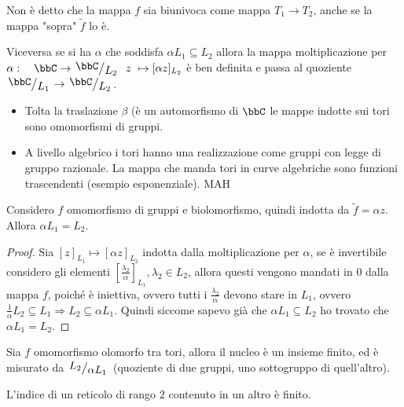 
\begin{osservazione}
Non è detto che la mappa $f$ sia biunivoca come mappa $T_1\rightarrow T_2$, anche se la mappa "sopra" $\tilde{f}$ lo è.
\end{osservazione}

Viceversa se si ha $\alpha$ che soddisfa $\alpha L_1 \subseteq L_2$  allora la mappa moltiplicazione per $\alpha: \quad \bbC \rightarrow \quotient{\bbC}{L_2} \hquad z\ \mapsto [\alpha z]_{L_2} $ è ben definita e passa al quoziente $\quotient{\bbC}{L_1}\rightarrow \quotient{\bbC}{L_2}$.

\begin{osservazione}
\begin{itemize}
\item Tolta la traslazione $\beta$ (è un automorfismo di $\bbC$ le mappe indotte sui tori sono omomorfismi di gruppi.
\item A livello algebrico i tori hanno una realizzazione come gruppi con legge di gruppo razionale.
La mappa che manda tori in curve algebriche sono funzioni trascendenti (esempio esponenziale). MAH
\end{itemize}
\end{osservazione}


\begin{fatto} Considero $f$ omomorfismo di gruppi e biolomorfismo, quindi indotta da $\tilde{f}=\alpha z$. Allora $\alpha L_1=L_2$.
\end{fatto}
\begin{proof}
Sia $[z]_{L_1} \mapsto [\alpha z]_{L_2}$ indotta dalla moltiplicazione per $\alpha$, se è invertibile considero gli elementi $[\frac{\lambda_2}{\alpha}]_{L_1}, \lambda_2 \in L_2$, allora questi vengono mandati in $0$ dalla mappa $f$, poiché è iniettiva, ovvero tutti i $\frac{\lambda_2}{\alpha}$ devono stare in $L_1$, ovvero $\frac{1}{\alpha} L_2 \subseteq L_1 \Rightarrow L_2 \subseteq \alpha L_1$.
Quindi siccome sapevo già che $\alpha L_1 \subseteq L_2$ ho trovato che $\alpha L_1 =L_2$.
\end{proof}

\begin{esercizio} Sia $f$ omomorfismo olomorfo tra tori, allora il nucleo è un insieme finito, ed è misurato da $\quotient{L_2}{\alpha L_1}$ (quoziente di due gruppi, uno sottogruppo di quell'altro).
\end{esercizio}

\begin{esercizio}
L'indice di un reticolo di rango $2$ contenuto in un altro è finito.
\end{esercizio}

